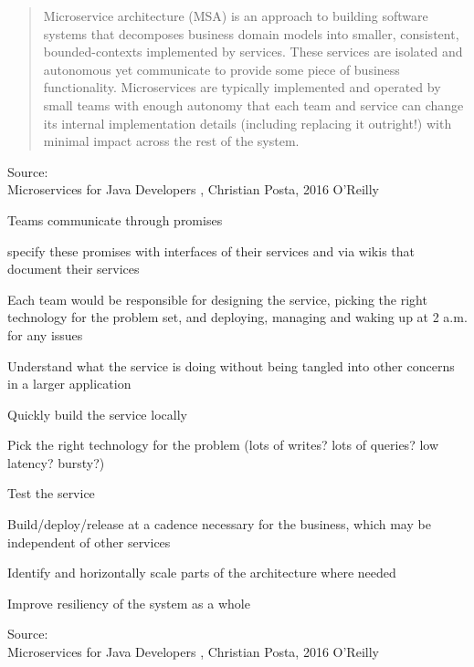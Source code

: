 \documentclass[Screen16to9,17pt]{foils}
\begin{document}
\begin{quote}\small
  Microservice architecture (MSA) is an approach to building software systems that decomposes business domain models into smaller,
  consistent, bounded-contexts implemented by services. These services are isolated and autonomous yet communicate to provide some
  piece of business functionality. Microservices are typically implemented and operated by small teams with enough autonomy that
  each team and service can change its internal implementation
  details (including replacing it outright!) with minimal impact across
  the rest of the system.
\end{quote}

Source: {\footnotesize\\
Microservices for Java Developers , Christian Posta, 2016 O’Reilly}







\begin{list2}
\item Teams communicate through promises
\item specify these promises with interfaces
of their services and via wikis that document their services
\item Each team would be responsible for designing the service, picking
the right technology for the problem set, and deploying, managing
and waking up at 2 a.m. for any issues
\item Understand what the service is doing without being tangled into
other concerns in a larger application
\item Quickly build the service locally
\item Pick the right technology for the problem (lots of writes? lots of
queries? low latency? bursty?)
\item Test the service
\item Build/deploy/release at a cadence necessary for the business,
which may be independent of other services
\item Identify and horizontally scale parts of the architecture where
needed
\item Improve resiliency of the system as a whole



\end{list2}
Source: {\footnotesize\\
Microservices for Java Developers , Christian Posta, 2016 O’Reilly}
\end{document}
